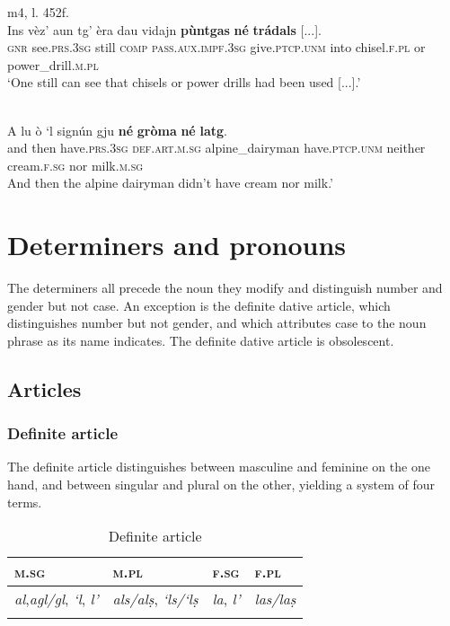 \ea
\label{}
 {m4, l. 452f.}\\
\gll Ins vèz’ aun tg’ èra dau vidajn \textbf{pùntgas} \textbf{né} \textbf{trádals} [...].\\
\textsc{gnr} see.\textsc{prs.3sg} still \textsc{comp} \textsc{pass.aux.impf.3sg} give.\textsc{ptcp.unm} into chisel.\textsc{f.pl} or power\_drill.\textsc{m.pl}\\
\glt `One still can see that chisels or power drills had been used [...].'
\z

\ea
\label{}
\\
\gll A lu ò `l signún gju \textbf{né} \textbf{gròma} \textbf{né} \textbf{latg}.\\
and then have.\textsc{prs.3sg} \textsc{def.art.m.sg} alpine\_dairyman have.\textsc{ptcp.unm} neither cream.\textsc{f.sg} nor milk.\textsc{m.sg}\\
\glt And then the alpine dairyman didn't have cream nor milk.'
\z


\section{Determiners and pronouns}
The determiners all precede the noun they modify and distinguish number and gender but not case. An exception is the definite dative article, which distinguishes number but not gender, and which attributes case to the noun phrase as its name indicates. The definite dative article is obsolescent.

\subsection{Articles}

\subsubsection{Definite article}
The definite article distinguishes between masculine and feminine on the one hand, and between singular and plural on the other, yielding a system of four terms.

\begin{table}
\caption{Definite article}
\label{tab:1:defart}
 \begin{tabular}{llll}
  \lsptoprule
   \textsc{m.sg}   &  \textsc{m.pl} & \textsc{f.sg} & \textsc{f.pl}\\ 
  \midrule
  \textit{al},\textit{agl/gl}, \textit{`l}, \textit{l'} & \textit{als/alṣ}, \textit{`ls/`lṣ} & \textit{la}, \textit{l'} &  \textit{las/laṣ}\\
\lspbottomrule
\end{tabular}
\end{table}

